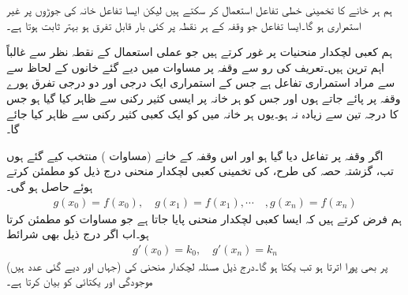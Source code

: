 ہم ہر خانے  کا تخمینی خطی تفاعل استعمال کر سکتے ہیں لیکن ایسا تفاعل خانہ کی جوڑوں پر غیر استمراری ہو گا۔ایسا تفاعل جو وقفہ  کے ہر نقطہ پر کئی بار قابل تفرق ہو  بہتر ثابت ہوتا ہے۔

ہم کعبی لچکدار منحنیات پر غور کرتے ہیں جو عملی استعمال کے نقطہ نظر سے غالباً اہم ترین ہیں۔تعریف کی رو سے وقفہ  پر مساوات  میں دیے گئے خانوں کے لحاظ سے     سے مراد استمراری تفاعل  ہے جس کے  استمراری ایک درجی اور دو درجی تفرق پورے وقفہ پر پائے جاتے ہوں اور جس کو ہر خانہ پر ایسی  کثیر رکنی سے ظاہر کیا گیا ہو جس کا درجہ تین سے زیادہ نہ ہو۔یوں ہر خانہ میں  کو ایک کعبی کثیر رکنی سے ظاہر کیا جائے گا۔

اگر وقفہ  پر تفاعل  دیا گیا ہو اور اس وقفہ کے خانے (مساوات ) منتخب کیے گئے ہوں تب، گزشتہ حصہ کی طرح،    کی تخمینی کعبی لچکدار منحنی  درج ذیل کو مطمئن کرتے ہوئے حاصل ہو گی۔
\begin{align}\label{مساوات_اعدادی_لچکدار_منحنی_ٹکڑے_ب}
g(x_0)=f(x_0),\quad g(x_1)=f(x_1),\cdots \quad, g(x_n)=f(x_n)
\end{align}
ہم فرض کرتے ہیں کہ ایسا کعبی لچکدار منحنی  پایا جاتا ہے جو مساوات  کو مطمئن کرتا  ہو۔اب اگر  درج ذیل بھی شرائط 
\begin{align}\label{مساوات_اعدادی_لچکدار_منحنی_ٹکڑے_پ}
g'(x_0)=k_0,\quad g'(x_n)=k_n
\end{align}
(جہاں  اور  دیے گئی عدد ہیں) پر بھی پورا اترتا ہو تب  یکتا ہو گا۔درج ذیل مسئلہ لچکدار منحنی کی موجودگی اور یکتائی کو بیان کرتا ہے۔

